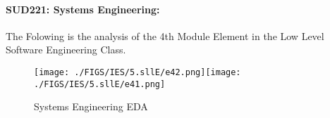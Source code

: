 \documentclass[12pt]{extreport}
\begin{document}
\begin{comment}
\subparagraph{Interpretation of the Box-plots:}
For This Element 

\begin{enumerate}	
	\item The MP Class Box-Plot:
	\begin{enumerate}
		\item MAX = a {} {} {} {} {} {} {} {} UQ = b {} {} {} {} {} {} {} {} Median = c
		\item LQ = d {} {} {} {} {} {} {} {}  MIN =	l {} {} {} {} {} {} {} {}  IQR = e - f = g
	\end{enumerate}
	\item The PSI Class Box-Plot:
	\begin{enumerate}
		\item MAX = a {} {} {} {} {} {} {} {} UQ = b {} {} {} {} {} {} {} {} Median = c
		\item LQ = d {} {} {} {} {} {} {} {}  MIN =	e {} {} {} {} {} {} {} {} IQR = f - g = h	
	\end{enumerate}
	\item The TSI Class Box-Plot:
	\begin{enumerate}
		\item MAX = a {} {} {} {} {} {} {} {} UQ = b {} {} {} {} {} {} {} {} Median = c
		\item LQ = d {} {} {} {} {} {} {} {} MIN = e {} {} {} {} {} {} {} {} IQR = f - g = h	
	\end{enumerate}
\end{enumerate}



\subparagraph{Interpretation of the histogram:}
This Frequency Distribution is (Skeness) with the following descriptive statistics:
\begin{enumerate}
	\item Mean = 
	\item STD = 
	\item Range = a - b = c
	\item IQR = a-b = c 
\end{enumerate}
\end{comment}




\paragraph{\large SUD221: Systems Engineering:\\
 } 
The Folowing is the analysis of the 4th Module Element in the Low Level Software Engineering Class.
\begin{figure}[H]
	\centering
	\texttt{[image: ./FIGS/IES/5.sllE/e42.png]}\texttt{[image: ./FIGS/IES/5.sllE/e41.png]}
	\caption{Systems Engineering EDA}
	\label{fig:64}
\end{figure}
\end{document}
